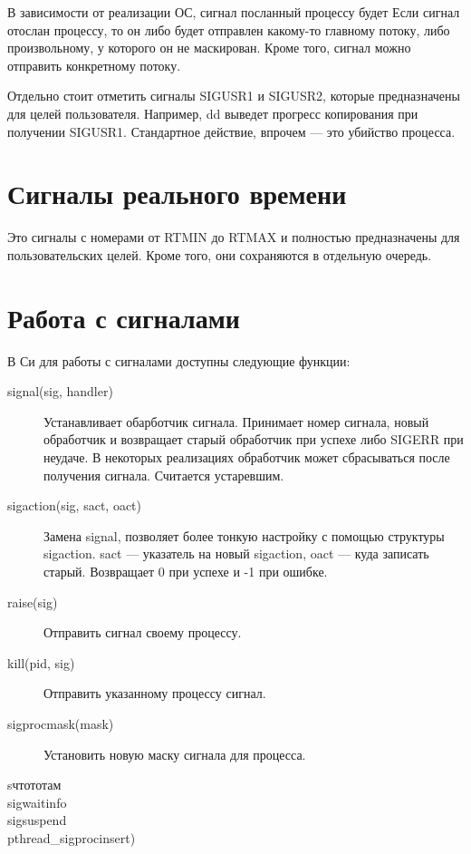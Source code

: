 \documentclass[main]{subfiles}
\begin{document}
В зависимости от реализации ОС, сигнал посланный процессу будет 
Если сигнал отослан процессу, то он либо будет отправлен какому-то главному
потоку, либо произвольному, у которого он не маскирован.
Кроме того, сигнал можно отправить конкретному потоку.

Отдельно стоит отметить сигналы SIGUSR1 и SIGUSR2, которые предназначены
для целей пользователя. Например, dd выведет прогресс копирования
при получении SIGUSR1. Стандартное действие, впрочем --- это убийство
процесса.

\section{Сигналы реального времени}
Это сигналы с номерами от RTMIN до RTMAX и полностью предназначены для
пользовательских целей. Кроме того, они сохраняются в отдельную очередь.

\section{Работа с сигналами}
В Си для работы с сигналами доступны следующие функции:
\begin{description}
\item[signal(sig, handler)] Устанавливает обарботчик сигнала.
Принимает номер сигнала, новый обработчик
и возвращает старый обработчик при успехе либо SIGERR при неудаче.
В некоторых реализациях обработчик может сбрасываться после получения сигнала.
Считается устаревшим.
\item[sigaction(sig, sact, oact)] Замена signal, позволяет более тонкую
настройку с помощью структуры sigaction. sact --- указатель на новый sigaction,
oact --- куда записать старый. Возвращает 0 при успехе и -1 при ошибке.
\item[raise(sig)] Отправить сигнал своему процессу.
\item[kill(pid, sig)] Отправить указанному процессу сигнал.
\item[sigprocmask(mask)] Установить новую маску сигнала для процесса.
\item[sчтототам]
\item[sigwaitinfo]
\item[sigsuspend]
\item[pthread\_sigprocinsert)]
\end{description}
\end{document}
